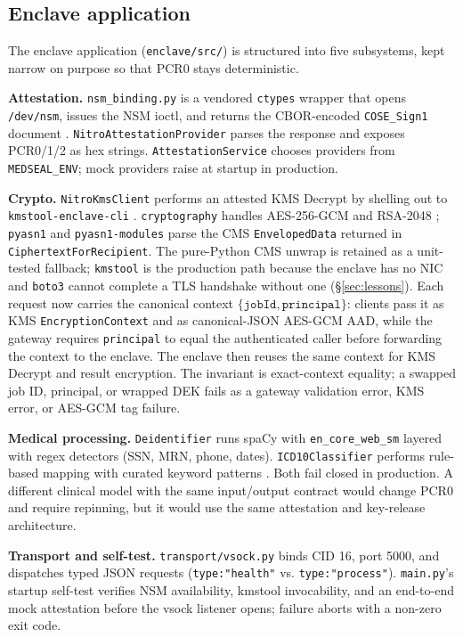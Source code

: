 \documentclass[11pt]{article}
\begin{document}
\subsection{Enclave application}

The enclave application (\texttt{enclave/src/}) is structured into
five subsystems, kept narrow on purpose so that PCR0 stays
deterministic.

\textbf{Attestation.}
\texttt{nsm\_binding.py} is a vendored \texttt{ctypes} wrapper that
opens \texttt{/dev/nsm}, issues the NSM ioctl, and returns the
CBOR-encoded \cite{rfc8949} \texttt{COSE\_Sign1} document
\cite{rfc9052}. \texttt{NitroAttestationProvider} parses the
response and exposes PCR0/1/2 as hex strings.
\texttt{AttestationService} chooses providers from
\texttt{MEDSEAL\_ENV}; mock providers raise at startup in
production.

\textbf{Crypto.}
\texttt{NitroKmsClient} performs an attested KMS Decrypt by
shelling out to \texttt{kmstool-enclave-cli} \cite{nitrosdk}.
\texttt{cryptography} \cite{pyca} handles AES-256-GCM
\cite{nistgcm} and RSA-2048 \cite{rfc8017}; \texttt{pyasn1} and
\texttt{pyasn1-modules} \cite{pyasn1} parse the CMS
\texttt{EnvelopedData} \cite{rfc5652} returned in
\texttt{CiphertextForRecipient}. The pure-Python CMS unwrap is
retained as a unit-tested fallback; \texttt{kmstool} is the
production path because the enclave has no NIC and \texttt{boto3}
cannot complete a TLS handshake without one (\S\ref{sec:lessons}).
Each request now carries the canonical context
$\{\texttt{jobId},\texttt{principal}\}$: clients pass it as KMS
\texttt{EncryptionContext} and as canonical-JSON AES-GCM AAD, while
the gateway requires \texttt{principal} to equal the authenticated
caller before forwarding the context to the enclave. The enclave then
reuses the same context for KMS Decrypt and result encryption. The
invariant is exact-context equality; a swapped job ID, principal, or
wrapped DEK fails as a gateway validation error, KMS error, or
AES-GCM tag failure.

\textbf{Medical processing.}
\texttt{Deidentifier} runs spaCy \cite{spacy} with
\texttt{en\_core\_web\_sm} layered with regex detectors (SSN, MRN,
phone, dates). \texttt{ICD10Classifier} performs rule-based mapping
with curated keyword patterns \cite{icd10}. Both fail closed in
production. A different clinical model with the same input/output
contract would change PCR0 and require repinning, but it would use the
same attestation and key-release architecture.

\textbf{Transport and self-test.}
\texttt{transport/vsock.py} binds CID 16, port 5000, and dispatches
typed JSON requests (\texttt{type:"health"} vs.
\texttt{type:"process"}). \texttt{main.py}'s startup self-test
verifies NSM availability, kmstool invocability, and an end-to-end
mock attestation before the vsock listener opens; failure aborts
with a non-zero exit code.
\end{document}
